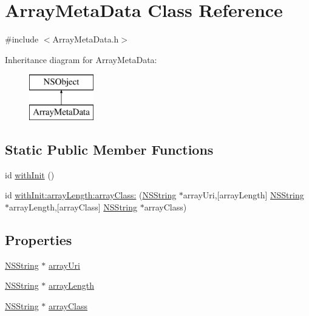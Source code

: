 \hypertarget{interface_array_meta_data}{
\section{\-Array\-Meta\-Data \-Class \-Reference}
\label{interface_array_meta_data}
}


{\ttfamily \#include $<$\-Array\-Meta\-Data.\-h$>$}

\-Inheritance diagram for \-Array\-Meta\-Data\-:\begin{figure}[H]
\begin{center}
\leavevmode
\includegraphics[height=2.000000cm]{interface_array_meta_data}
\end{center}
\end{figure}
\subsection*{\-Static \-Public \-Member \-Functions}
\begin{DoxyCompactItemize}
\item 
id \hyperlink{interface_array_meta_data_a2318e49d41c9ba108190bf0222306fd2}{with\-Init} ()
\item 
id \hyperlink{interface_array_meta_data_aaa469e959673c35e2b5a6dbbf96dc953}{with\-Init\-:array\-Length\-:array\-Class\-:} (\hyperlink{class_n_s_string}{\-N\-S\-String} $\ast$array\-Uri,\mbox{[}array\-Length\mbox{]} \hyperlink{class_n_s_string}{\-N\-S\-String} $\ast$array\-Length,\mbox{[}array\-Class\mbox{]} \hyperlink{class_n_s_string}{\-N\-S\-String} $\ast$array\-Class)
\end{DoxyCompactItemize}
\subsection*{\-Properties}
\begin{DoxyCompactItemize}
\item 
\hyperlink{class_n_s_string}{\-N\-S\-String} $\ast$ \hyperlink{interface_array_meta_data_a860a557b87e0c559db7fd7c840409cee}{array\-Uri}
\item 
\hyperlink{class_n_s_string}{\-N\-S\-String} $\ast$ \hyperlink{interface_array_meta_data_a450df0dafccdb9905bc4164e91129026}{array\-Length}
\item 
\hyperlink{class_n_s_string}{\-N\-S\-String} $\ast$ \hyperlink{interface_array_meta_data_adc0bd99d0f5b34b67b312779a298f294}{array\-Class}
\end{DoxyCompactItemize}


